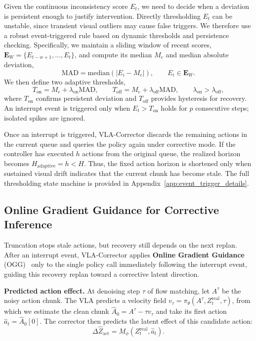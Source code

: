 Given the continuous inconsistency score $E_t$, we need to decide when a deviation is persistent enough to justify intervention. Directly thresholding $E_t$ can be unstable, since transient visual outliers may cause false triggers. We therefore use a robust event-triggered rule based on dynamic thresholds and persistence checking. Specifically, we maintain a sliding window of recent scores, $\mathbf{E}_W=\{E_{t-w+1},\dots,E_t\}$, and compute its median $M_e$ and median absolute deviation,
\begin{equation}
\mathrm{MAD}=\mathrm{median}\!\left(|E_i-M_e|\right), \qquad E_i\in\mathbf{E}_W .
\label{eq:mad_main}
\end{equation}
We then define two adaptive thresholds,
\begin{equation}
T_{\mathrm{on}} = M_e+\lambda_{\mathrm{on}}\mathrm{MAD}, 
\qquad
T_{\mathrm{off}} = M_e+\lambda_{\mathrm{off}}\mathrm{MAD},
\qquad
\lambda_{\mathrm{on}}>\lambda_{\mathrm{off}},
\label{eq:dual_threshold_main}
\end{equation}
where $T_{\mathrm{on}}$ confirms persistent deviation and $T_{\mathrm{off}}$ provides hysteresis for recovery. An interrupt event is triggered only when $E_t>T_{\mathrm{on}}$ holds for $p$ consecutive steps; isolated spikes are ignored.

Once an interrupt is triggered, VLA-Corrector discards the remaining actions in the current queue and queries the policy again under corrective mode. If the controller has executed $h$ actions from the original queue, the realized horizon becomes $H_{\mathrm{adaptive}}=h<H$. Thus, the fixed action horizon is shortened only when sustained visual drift indicates that the current chunk has become stale. The full thresholding state machine is provided in Appendix~\ref{app:event_trigger_details}.

\subsection{Online Gradient Guidance for Corrective Inference}

Truncation stops stale actions, but recovery still depends on the next replan. After an interrupt event, VLA-Corrector applies \textbf{Online Gradient Guidance} (OGG)~\cite{park2025acg} only to the single policy call immediately following the interrupt event, guiding this recovery replan toward a corrective latent direction.

\textbf{Predicted action effect.}
At denoising step $\tau$ of flow matching, let $A^\tau$ be the noisy action chunk. The VLA predicts a velocity field $v_\tau=\pi_\theta(A^\tau,Z_t^{\mathrm{real}},\tau)$, from which we estimate the clean chunk $\hat{A}_0=A^\tau-\tau v_\tau$ and take its first action $\hat{a}_t=\hat{A}_0[0]$. The corrector then predicts the latent effect of this candidate action:
\begin{equation}
\Delta\hat{Z}_{\mathrm{act}}=M_\phi(Z_t^{\mathrm{real}},\hat{a}_t).
\label{eq:ogg_predicted_effect}
\end{equation}

